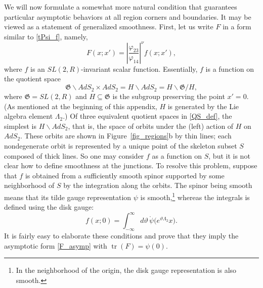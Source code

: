 \documentclass[12pt]{article}
\newcommand{\vp}{\varphi}
\newcommand{\vt}{\vartheta}
\newcommand{\RR}{\mathbb{R}}
\DeclareMathOperator{\tr}{tr}
\DeclareMathOperator{\SL}{SL}
\DeclareMathOperator{\AdS}{AdS}
\newcommand{\GG}{\mathfrak{G}}
\newcommand{\tGG}{\widetilde{\GG}}
\def\widetilde#1{#1}%
\def\AdS{AdS}
\def\SL{SL}
\def\RR{R}
\begin{document}
We will now formulate a somewhat more natural condition that guarantees particular asymptotic behaviors at all region corners and boundaries. It may be viewed as a statement of generalized smoothness. First, let us write $F$ in a form similar to \eqref{tPsi_f}, namely,
\begin{equation}
F(x;x')=\left|\frac{\vp_{23}}{\vp_{14}}\right|^{\nu}f(x;x'),
\end{equation}
where $f$ is an $\widetilde{\SL}(2,\RR)$-invariant scalar function. Essentially, $f$ is a function on the quotient space
\begin{equation} \label{QS_def}
\tGG\backslash\widetilde{\AdS}_2\times\widetilde{\AdS}_2
=H\backslash\widetilde{\AdS}_2=H\backslash\tGG/H,
\end{equation}
where $\tGG=\widetilde{\SL}(2,\RR)$ and $H\subseteq\tGG$ is the subgroup preserving the point $x'=0$. (As mentioned at the beginning of this appendix, $H$ is generated by the Lie algebra element $\Lambda_2$.) Of three equivalent quotient spaces in \eqref{QS_def}, the simplest is $H\backslash\widetilde{\AdS}_2$, that is, the space of orbits under the (left) action of $H$ on $\widetilde{\AdS}_2$. These orbits are shown in Figure~\ref{fig_regions}b by thin lines; each nondegenerate orbit is represented by a unique point of the skeleton subset $S$ composed of thick lines. So one may consider $f$ as a function on $S$, but it is not clear how to define smoothness at the junctions. To resolve this problem, suppose that $f$ is obtained from a sufficiently smooth spinor supported by some neighborhood of $S$ by the integration along the orbits. The spinor being smooth means that its tilde gauge representation $\psi$ is smooth,\footnote{In the neighborhood of the origin, the disk gauge representation is also smooth.} whereas the integrals is defined using the disk gauge:
\begin{equation}
f(x;0)=\int_{-\infty}^{\infty}d\vt\,
\mathring{\psi}\bigl(e^{\vt\Lambda_2}x\bigr).
\end{equation}
It is fairly easy to elaborate these conditions and prove that they imply the asymptotic form \eqref{F_asymp} with $\tr(F)=\psi(0)$.
\end{document}
